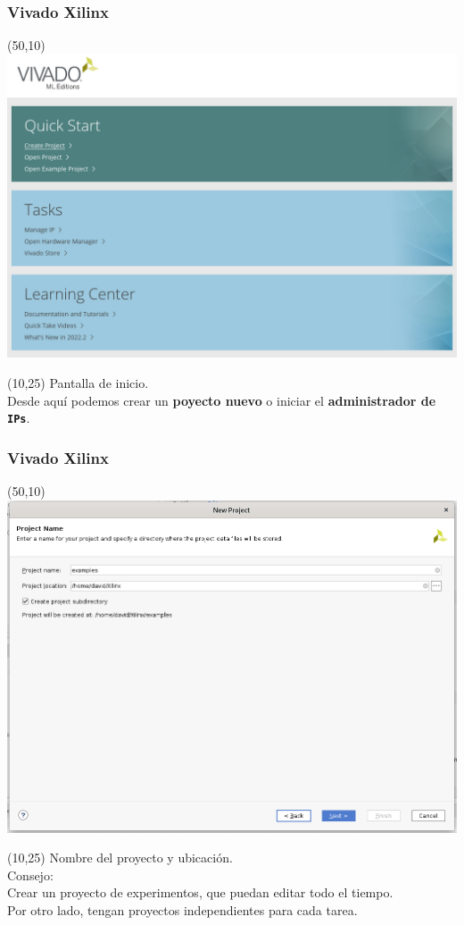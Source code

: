 \documentclass[aspectratio=169]{beamer}
\begin{document}
\begin{frame}[fragile,t]
    \frametitle{Vivado Xilinx}
    \begin{textblock}{75}(50,10) \includegraphics[scale=0.27]{img/vivado/01_start_page.png} \end{textblock}
    \begin{textblock}{38}(10,25) \small
     Pantalla de inicio.\\
     Desde aquí podemos crear un \textbf{poyecto nuevo} o iniciar el \textbf{administrador de \texttt{IPs}}.
    \end{textblock}
\end{frame}

\begin{frame}[fragile,t]
    \frametitle{Vivado Xilinx}
    \begin{textblock}{75}(50,10) \includegraphics[scale=0.27]{img/vivado/02_new_project.png} \end{textblock}
    \begin{textblock}{38}(10,25) \small
     Nombre del proyecto y ubicación.\\
     \bigskip
     \textcolor{verdeuca}{Consejo:\\ Crear un proyecto de experimentos, que puedan editar todo el tiempo.\\ Por otro lado, tengan proyectos independientes para cada tarea.}
    \end{textblock}
\end{frame}
    
\end{document}
